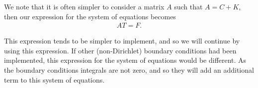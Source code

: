 \documentclass[../fem.tex]{subfiles}
\begin{document}
We note that it is often simpler to consider a matrix $A$ such that $A=C+K$,
then our expression for the system of equations becomes
\begin{align*}
   AT=F.
\end{align*}

This expression tends to be simpler to implement, and so we will continue by
using this expression. If other (non-Dirichlet) boundary conditions had been
implemented, this expression for the system of equations would be different. As
the boundary conditions integrals are not zero, and so they will add an
additional term to this system of equations.
\end{document}

